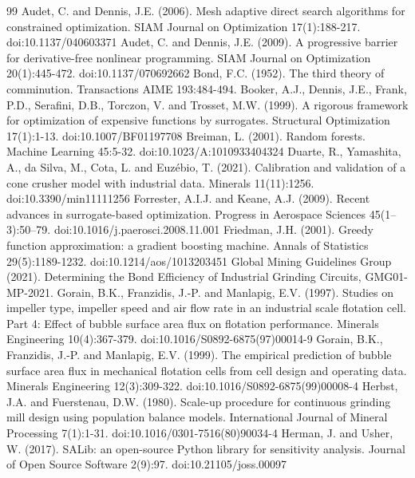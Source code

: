 \documentclass[10pt]{article}
\begin{document}
\begingroup
\small
\raggedright
\begin{thebibliography}{99}
 Audet, C. and Dennis, J.E. (2006). Mesh adaptive direct search algorithms for constrained optimization. SIAM Journal on Optimization 17(1):188-217. doi:10.1137/040603371
 Audet, C. and Dennis, J.E. (2009). A progressive barrier for derivative-free nonlinear programming. SIAM Journal on Optimization 20(1):445-472. doi:10.1137/070692662
 Bond, F.C. (1952). The third theory of comminution. Transactions AIME 193:484-494.
 Booker, A.J., Dennis, J.E., Frank, P.D., Serafini, D.B., Torczon, V. and Trosset, M.W. (1999). A rigorous framework for optimization of expensive functions by surrogates. Structural Optimization 17(1):1-13. doi:10.1007/BF01197708
 Breiman, L. (2001). Random forests. Machine Learning 45:5-32. doi:10.1023/A:1010933404324
 Duarte, R., Yamashita, A., da Silva, M., Cota, L. and Euzébio, T. (2021). Calibration and validation of a cone crusher model with industrial data. Minerals 11(11):1256. doi:10.3390/min11111256
 Forrester, A.I.J. and Keane, A.J. (2009). Recent advances in surrogate-based optimization. Progress in Aerospace Sciences 45(1--3):50--79. doi:10.1016/j.paerosci.2008.11.001
 Friedman, J.H. (2001). Greedy function approximation: a gradient boosting machine. Annals of Statistics 29(5):1189-1232. doi:10.1214/aos/1013203451
 Global Mining Guidelines Group (2021). Determining the Bond Efficiency of Industrial Grinding Circuits, GMG01-MP-2021.
 Gorain, B.K., Franzidis, J.-P. and Manlapig, E.V. (1997). Studies on impeller type, impeller speed and air flow rate in an industrial scale flotation cell. Part 4: Effect of bubble surface area flux on flotation performance. Minerals Engineering 10(4):367-379. doi:10.1016/S0892-6875(97)00014-9
 Gorain, B.K., Franzidis, J.-P. and Manlapig, E.V. (1999). The empirical prediction of bubble surface area flux in mechanical flotation cells from cell design and operating data. Minerals Engineering 12(3):309-322. doi:10.1016/S0892-6875(99)00008-4
 Herbst, J.A. and Fuerstenau, D.W. (1980). Scale-up procedure for continuous grinding mill design using population balance models. International Journal of Mineral Processing 7(1):1-31. doi:10.1016/0301-7516(80)90034-4
 Herman, J. and Usher, W. (2017). SALib: an open-source Python library for sensitivity analysis. Journal of Open Source Software 2(9):97. doi:10.21105/joss.00097

\end{thebibliography}
\end{document}

